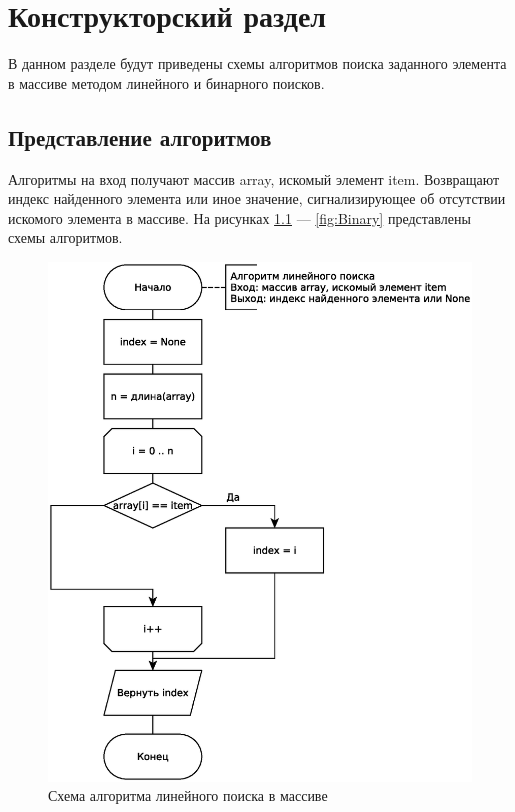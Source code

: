 \chapter{Конструкторский раздел}
В данном разделе будут приведены схемы алгоритмов поиска заданного элемента в массиве методом линейного и бинарного поисков.

\section{Представление алгоритмов}

Алгоритмы на вход получают массив array, искомый элемент item. Возвращают индекс найденного элемента или иное значение, сигнализирующее об отсутствии искомого элемента в массиве. На рисунках \ref{fig:Liniar} --- \ref{fig:Binary} представлены схемы алгоритмов.

\begin{figure}[h]
	\centering
	\includegraphics[scale=0.65]{img/liniar_search.eps}
	\caption{Схема алгоритма линейного поиска в массиве}
	\label{fig:Liniar}
\end{figure}

